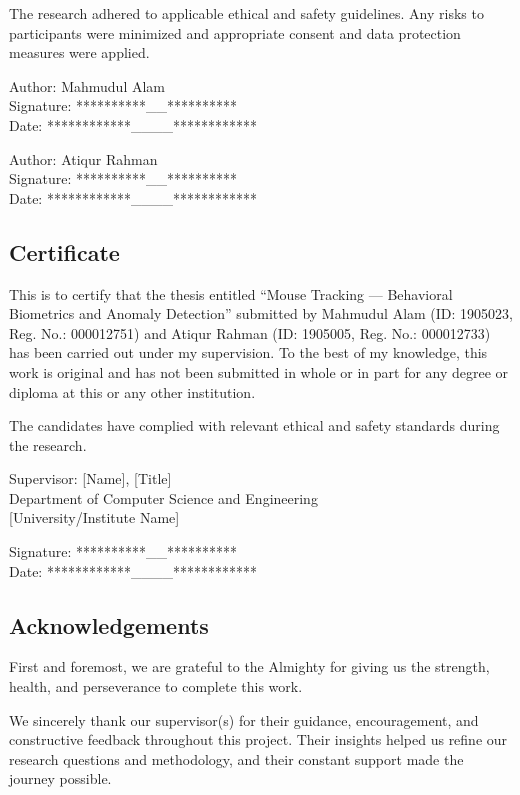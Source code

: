 \documentclass[
  12pt,
]{article}
\begin{document}
The research adhered to applicable ethical and safety guidelines. Any
risks to participants were minimized and appropriate consent and data
protection measures were applied.

Author: Mahmudul Alam\\
Signature: **********\_\_**********\\
Date: ************\_\_\_\_************

Author: Atiqur Rahman\\
Signature: **********\_\_**********\\
Date: ************\_\_\_\_************

\newpage

\newpage

\subsection{Certificate}\label{certificate}

This is to certify that the thesis entitled ``Mouse Tracking ---
Behavioral Biometrics and Anomaly Detection'' submitted by Mahmudul Alam
(ID: 1905023, Reg. No.: 000012751) and Atiqur Rahman (ID: 1905005, Reg.
No.: 000012733) has been carried out under my supervision. To the best
of my knowledge, this work is original and has not been submitted in
whole or in part for any degree or diploma at this or any other
institution.

The candidates have complied with relevant ethical and safety standards
during the research.

Supervisor: {[}Name{]}, {[}Title{]}\\
Department of Computer Science and Engineering\\
{[}University/Institute Name{]}

Signature: **********\_\_**********\\
Date: ************\_\_\_\_************

\newpage

\newpage

\subsection{Acknowledgements}\label{acknowledgements}

First and foremost, we are grateful to the Almighty for giving us the
strength, health, and perseverance to complete this work.

We sincerely thank our supervisor(s) for their guidance, encouragement,
and constructive feedback throughout this project. Their insights helped
us refine our research questions and methodology, and their constant
support made the journey possible.
\end{document}
